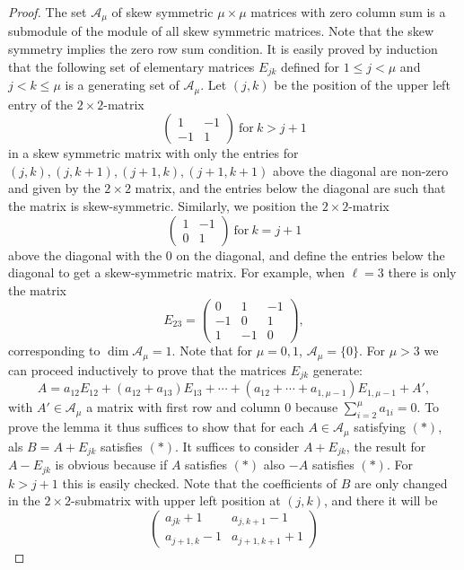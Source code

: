 \documentclass[11pt]{article}
\theoremstyle{definition}
\theoremstyle{remark}
\theoremstyle{remark}
\begin{document}
\begin{proof} The set $\mathcal{A}_{\mu }$ of skew symmetric $\mu \times \mu $ matrices  with zero column sum is a submodule of the module of all skew symmetric matrices. Note that the skew symmetry implies the zero row sum condition. It is easily proved by induction that the following set of elementary matrices $E_{jk}$ defined for $1\leq j<\mu$ and $j<k\leq \mu $ is a generating set of $\mathcal{A}_{\mu}$. Let $(j,k)$ be the position of the upper left entry of the $2\times 2$-matrix 
$$\begin{pmatrix} 1 &  -1 \\ -1 & 1\end{pmatrix}\ \textrm{for} \ k>j+1$$
in a skew symmetric matrix with only the entries for $(j,k), (j,k+1), (j+1,k), (j+1,k+1)$ above the diagonal are non-zero and given by the $2\times 2$ matrix, and the entries below the diagonal are such that the matrix is skew-symmetric. Similarly,  we position the $2\times 2$-matrix
$$\begin{pmatrix} 1 & -1 \\ 0 & 1\end{pmatrix} \ \textrm{for}\ k=j+1$$
above the diagonal with the $0$ on the diagonal, and define the entries below the diagonal to get a skew-symmetric matrix. For example, when $\ell =3$ there is only the matrix
$$E_{23}=\begin{pmatrix} 0 & 1 & -1 \\ -1 & 0 & 1 \\ 1 & -1 & 0 \end{pmatrix},$$
corresponding to $\dim \mathcal{A}_{\mu }=1$. Note that for $\mu =0,1$, $\mathcal{A}_{\mu }=\{0\}$. For $\mu >3$ we can proceed inductively to prove that the matrices $E_{jk}$ generate:
$$A=a_{12}E_{12}+(a_{12}+a_{13})E_{13}+\cdots +(a_{12}+\cdots +a_{1,\mu -1})E_{1,\mu -1}+A',$$
with $A'\in \mathcal{A}_{\mu }$ a matrix with first row and column $0$ because $\sum_{i=2}^{\mu } a_{1i}=0$. To prove the lemma it thus suffices to show that for each $A\in \mathcal{A}_{\mu }$ satisfying $(*)$, als $B=A+E_{jk}$ satisfies $(*)$. It suffices to consider $A+E_{jk}$, the result for $A-E_{jk}$ is obvious because if $A$ satisfies $(*)$ also $-A$ satisfies $(*)$. For $k>j+1$ this is easily checked. Note that the coefficients of $B$ are only changed in the $2\times 2$-submatrix with upper left position at $(j,k)$, and there it will be
$$\begin{pmatrix} a_{jk}+1 & a_{j,k+1}-1 \\ a_{j+1,k}-1 & a_{j+1,k+1}+1\end{pmatrix}$$

\end{proof}
\end{document}
